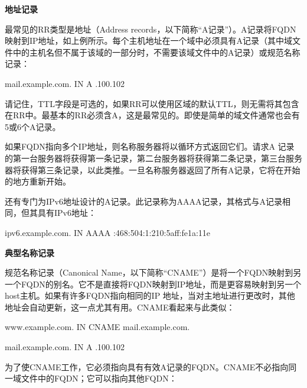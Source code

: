 ﻿\documentclass[english,runningheads,a4paper]{llncs}[2018/03/10]
\begin{document}
\vbox{}

\par\noindent\textbf{地址记录}

\par\noindent 最常见的RR类型是地址（Address records，以下简称“A记录”）。A记录将FQDN映射到IP地址，如上例所示。每个主机地址在一个域中必须具有A记录（其中域文件中的主机名但不属于该域的一部分时，不需要该域文件中的A记录）或规范名称记录：

\par\setlength\parindent{2em}mail.example.com.  \qquad IN \qquad A .100.102

\par\setlength\parindent{2em}请记住，TTL字段是可选的，如果RR可以使用区域的默认TTL，则无需将其包含在RR中。最基本的RR必须含A，这是最常见的。即使是简单的域文件通常也会有5或6个A记录。

\par\setlength\parindent{2em}如果FQDN指向多个IP地址，则名称服务器将以循环方式返回它们。请求A 记录的第一台服务器将获得第一条记录，第二台服务器将获得第二条记录，第三台服务器将获得第三条记录，以此类推。一旦名称服务器返回了所有A记录，它将在开始的地方重新开始。

\par\setlength\parindent{2em}还有专门为IPv6地址设计的A记录。此记录称为AAAA记录，其格式与A记录相同，但其具有IPv6地址：

\par\setlength\parindent{2em}ipv6.example.com.  \quad IN \quad AAAA :468:504:1:210:5aff:fe1a:11e

\vbox{}

\par\noindent\textbf{典型名称记录}

\par\noindent 规范名称记录（Canonical Name，以下简称“CNAME”）是将一个FQDN映射到另一个FQDN的别名。它不是直接将FQDN映射到IP地址，而是更容易映射到另一个host主机。如果有许多FQDN指向相同的IP 地址，当对主地址进行更改时，其他地址会自动更新，这一点尤其有用。CNAME看起来与此类似：

\par\setlength\parindent{2em}www.example.com.  \qquad IN \qquad CNAME \qquad mail.example.com.

\par\setlength\parindent{2em}mail.example.com.  \qquad IN \qquad A .100.102

\par\setlength\parindent{2em}为了使CNAME工作，它必须指向具有有效A记录的FQDN。CNAME不必指向同一域文件中的FQDN；它可以指向其他FQDN：
\end{document}
